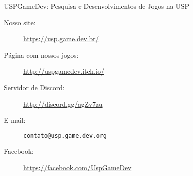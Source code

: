 \begin{subsecao}{USPGameDev: Pesquisa e Desenvolvimentos de Jogos na USP}
\begin{description}
  \item[Nosso site:] \url{https://usp.game.dev.br/}
  \item[Página com nossos jogos:] \url{http://uspgamedev.itch.io/}
  \item[Servidor de Discord:] \url{http://discord.gg/agZv7zu}
  \item[E-mail:] {\tt contato@usp.game.dev.org}
  \item[Facebook:] \url{https://facebook.com/UspGameDev}
\end{description}

\end{subsecao}
